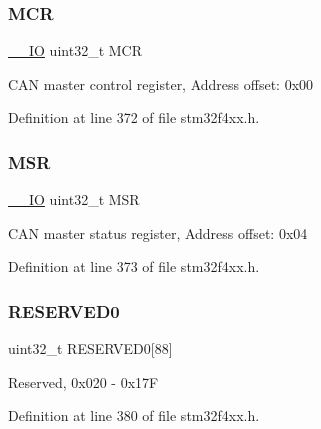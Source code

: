 \subsubsection{\texorpdfstring{M\+CR}{MCR}}
{\footnotesize\ttfamily \hyperlink{group___c_m_s_i_s__core__definitions_gaec43007d9998a0a0e01faede4133d6be}{\+\_\+\+\_\+\+IO} uint32\+\_\+t M\+CR}

C\+AN master control register, Address offset\+: 0x00 

Definition at line 372 of file stm32f4xx.\+h.

\mbox{\label{struct_c_a_n___type_def_acdd4c1b5466be103fb2bb2a225b1d3a9}} 
\subsubsection{\texorpdfstring{M\+SR}{MSR}}
{\footnotesize\ttfamily \hyperlink{group___c_m_s_i_s__core__definitions_gaec43007d9998a0a0e01faede4133d6be}{\+\_\+\+\_\+\+IO} uint32\+\_\+t M\+SR}

C\+AN master status register, Address offset\+: 0x04 

Definition at line 373 of file stm32f4xx.\+h.

\mbox{\label{struct_c_a_n___type_def_aae28ab86a4ae57ed057ed1ea89a6d34b}} 
\subsubsection{\texorpdfstring{R\+E\+S\+E\+R\+V\+E\+D0}{RESERVED0}}
{\footnotesize\ttfamily uint32\+\_\+t R\+E\+S\+E\+R\+V\+E\+D0\mbox{[}88\mbox{]}}

Reserved, 0x020 -\/ 0x17F 

Definition at line 380 of file stm32f4xx.\+h.

\mbox{\label{struct_c_a_n___type_def_a4bb07a7828fbd5fe86f6a5a3545c177d}} 
